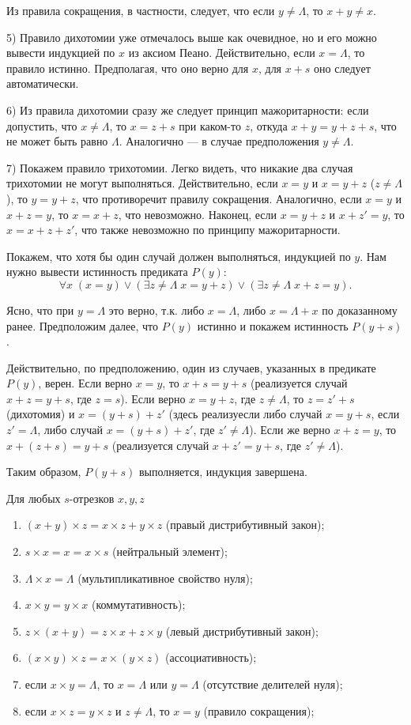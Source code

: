 Из правила сокращения, в частности, следует, что если $y\ne\Lambda$, то $x+y\ne x$.

5) Правило дихотомии уже отмечалось выше как очевидное, но и его можно вывести индукцией по $x$ из аксиом Пеано. Действительно, если $x=\Lambda$, то правило истинно. Предполагая, что оно верно для $x$, для $x+s$ оно следует автоматически.

6) Из правила дихотомии сразу же следует принцип мажоритарности: если допустить, что $x\ne\Lambda$, то $x=z+s$ при каком-то $z$, откуда $x+y=y+z+s$, что не может быть равно $\Lambda$. Аналогично --- в случае предположения $y\ne\Lambda$.

7) Покажем правило трихотомии. Легко видеть, что никакие два случая трихотомии не могут выполняться. Действительно, если $x=y$ и $x=y+z$ ($z\ne\Lambda$), то $y=y+z$, что противоречит правилу сокращения. Аналогично, если $x=y$ и $x+z=y$, то $x=x+z$, что невозможно. Наконец, если $x=y+z$ и $x+z'=y$, то $x=x+z+z'$, что также невозможно по принципу мажоритарности.

Покажем, что хотя бы один случай должен выполняться, индукцией по $y$. Нам нужно вывести истинность предиката $P(y)$:
$$
\forall x\;(x=y)\lor(\exists z\ne\Lambda\;x=y+z)\lor(\exists z\ne\Lambda\;x+z=y).
$$

Ясно, что при $y=\Lambda$ это верно, т.к. либо $x=\Lambda$, либо $x=\Lambda+x$ по доказанному ранее. Предположим далее, что $P(y)$ истинно и покажем истинность $P(y+s)$.

Действительно, по предположению, один из случаев, указанных в предикате $P(y)$, верен. Если верно $x=y$, то $x+s=y+s$ (реализуется случай $x+z=y+s$, где $z=s$). Если верно $x=y+z$, где $z\ne\Lambda$, то $z=z'+s$ (дихотомия) и $x=(y+s)+z'$ (здесь реализуесли либо случай $x=y+s$, если $z'=\Lambda$, либо случай $x=(y+s)+z'$, где $z'\ne\Lambda$).
Если же верно $x+z=y$, то $x+(z+s)=y+s$ (реализуется случай $x+z'=y+s$, где $z'\ne\Lambda$).

Таким образом, $P(y+s)$ выполняется, индукция завершена.
\epf


\begin{thrm}\label{Production} Для любых $s$-отрезков $x,y,z$
\begin{enumerate}[P1]
\item $(x+y)\times z=x\times z+y\times z$ (правый дистрибутивный закон);
\item $s\times x=x=x\times s$ (нейтральный элемент);
\item $\Lambda\times x=\Lambda$ (мультипликативное свойство нуля);
\item $x\times y=y\times x$ (коммутативность);
\item $z\times (x+y)=z\times x+z\times y$ (левый дистрибутивный закон);
\item $(x\times y)\times z=x\times(y\times z)$ (ассоциативность);
\item если $x\times y=\Lambda$, то $x=\Lambda$ или $y=\Lambda$ (отсутствие делителей нуля);
\item если $x\times z=y\times z$ и $z\ne\Lambda$, то $x=y$ (правило сокращения);
\end{enumerate}
\end{thrm}
\quad{}


